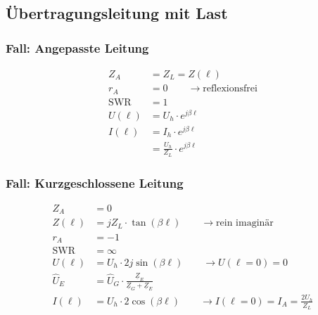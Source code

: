 \subsection{Übertragungsleitung mit Last}



\subsubsection{Fall: Angepasste Leitung}
\begin{align*}
    Z_A          & = Z_L = Z(\ell)                              \\
    r_A          & = 0\qquad\rightarrow\text{reflexionsfrei} \\
    \mathrm{SWR} & = 1                                       \\
    U(\ell)         & = U_h\cdot e ^{j\beta \ell}                  \\
    I(\ell)         & = I_h \cdot e^{j\beta \ell}                  \\
                 & = \frac{U_h}{Z_L}\cdot e^{j\beta \ell}
\end{align*}

\subsubsection{Fall: Kurzgeschlossene Leitung}
\begin{align*}
    Z_A          & = 0                                                                                         \\
    Z(\ell)         & = j Z_L\cdot\tan(\beta \ell)        \qquad\rightarrow\text{rein imaginär}                      \\
    r_A          & = -1                                                                                        \\
    \mathrm{SWR} & = \infty                                                                                    \\
    U(\ell)         & = U_h\cdot 2j\sin(\beta \ell)    \qquad\rightarrow U(\ell=0)=0                                    \\
    \hat{U}_E    & = \hat{U}_{G}\cdot\frac{\underline{Z}_E}{\underline{Z}_{G}+\underline{Z}_E} \\
    I(\ell)         & = U_h\cdot 2\cos(\beta \ell)    \qquad\rightarrow I(\ell=0)=I_A=\frac{2U_h}{Z_L}
\end{align*}

